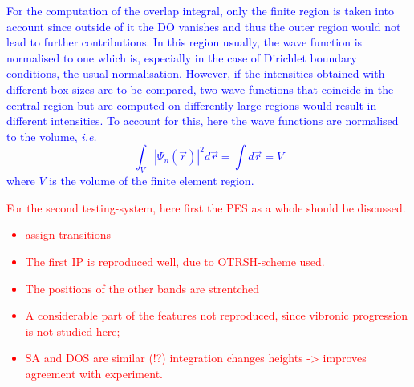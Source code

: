 \textcolor{blue}{
For the computation of the overlap integral, only the finite region is taken into account since outside of it the DO vanishes and thus the outer region would not lead to further contributions.
In this region usually, the wave function is normalised to one which is, especially in the case of Dirichlet boundary conditions, the usual normalisation.
However, if the intensities obtained with different box-sizes are to be compared, two wave functions that coincide in the central region but are computed on differently large regions would result in different intensities.
To account for this, here the wave functions are normalised to the volume, \textit{i.e.}
\begin{equation}
\int_V \left|\Psi_n (\vec{r})\right|^2d\vec{r}=\int d\vec{r}=V
\end{equation}
where $V$ is the volume of the finite element region.}

\textcolor{red}{
For the second testing-system, here first the PES as a whole should be discussed.
\begin{itemize}
   \item assign transitions
   \item The first IP is reproduced well, due to OTRSH-scheme used.
   \item The positions of the other bands are strentched
   \item A considerable part of the features not reproduced, since vibronic progression is not studied here;
   \item SA and DOS are similar (!?) integration changes heights -> improves agreement with experiment.
\end{itemize}
}

